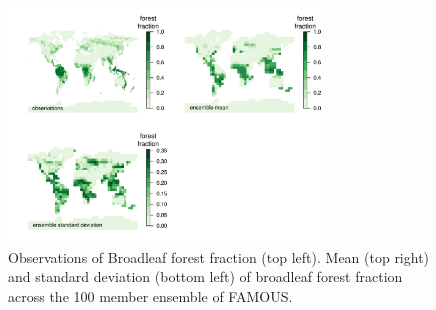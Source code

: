 \documentclass[esd, article]{copernicus} %
\providecommand{\DIFaddbeginFL}{} %
\providecommand{\DIFaddendFL}{} %
\providecommand{\DIFdelbeginFL}{} %
\providecommand{\DIFdelendFL}{} %
\begin{document}














\begin{figure}[t]
\DIFdelbeginFL %
\DIFdelendFL \DIFaddbeginFL \includegraphics[width=8.3cm]{graphics/BL_obs_ensemble_mean_sd.pdf}
\DIFaddendFL \caption{Observations of Broadleaf forest fraction (top left). Mean (top right) and standard deviation (bottom left) of broadleaf forest fraction across the 100 member ensemble of FAMOUS.}
\label{fig:BL_obs_ensemble_mean_sd}
\end{figure}
\end{document}
